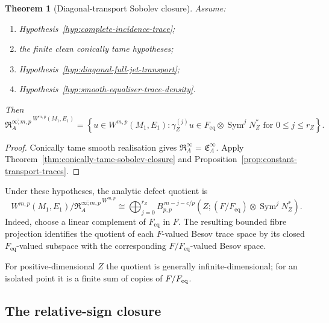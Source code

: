 \documentclass[11pt]{article}
\theoremstyle{plain}
\newtheorem{theorem}{Theorem}[section]
\theoremstyle{definition}
\begin{document}
\begin{theorem}[Diagonal-transport Sobolev closure]
\label{thm:constant-transport-closure}
Assume:

\begin{enumerate}[label=\textup{(\roman*)}]
  \item Hypothesis~\ref{hyp:complete-incidence-trace};

  \item the finite clean conically tame hypotheses;

  \item Hypothesis~\ref{hyp:diagonal-full-jet-transport};

  \item Hypothesis~\ref{hyp:smooth-equaliser-trace-density}.
\end{enumerate}

Then
\[
  \boxed{
  \overline{
    \mathfrak R_A^{\infty;m,p}
  }^{\,W^{m,p}(M_1,E_1)}
  =
  \left\{
    u\in W^{m,p}(M_1,E_1):
    \gamma_Z^{(j)}u
    \in
    F_{\mathrm{eq}}
    \otimes
    \operatorname{Sym}^jN_Z^*
    \text{ for }0\leq j\leq r_Z
  \right\}.
  }
\]
\end{theorem}

\begin{proof}
Conically tame smooth realisation gives
\(\mathfrak R_A^\infty = \mathfrak E_A^\infty\).
Apply
Theorem~\ref{thm:conically-tame-sobolev-closure}
and
Proposition~\ref{prop:constant-transport-traces}.
\end{proof}

Under these hypotheses, the analytic defect quotient is
\[
  W^{m,p}(M_1,E_1)
  \Big/
  \overline{
    \mathfrak R_A^{\infty;m,p}
  }^{\,W^{m,p}}
  \cong
  \bigoplus_{j=0}^{r_Z}
  B_{p,p}^{\,m-j-c/p}
  \left(
    Z;
    (F/F_{\mathrm{eq}})
    \otimes
    \operatorname{Sym}^jN_Z^*
  \right).
\]
Indeed, choose a linear complement of \(F_{\mathrm{eq}}\) in \(F\).
The resulting bounded fibre projection identifies the quotient of each
\(F\)-valued Besov trace space by its closed
\(F_{\mathrm{eq}}\)-valued subspace with the corresponding
\(F/F_{\mathrm{eq}}\)-valued Besov space.

For positive-dimensional \(Z\) the quotient is generally infinite-dimensional; for an isolated point it is a finite sum of copies of \(F/F_{\rm eq}\).

\subsection{The relative-sign closure}
\label{subsec:relative-sign-closure}
\end{document}
